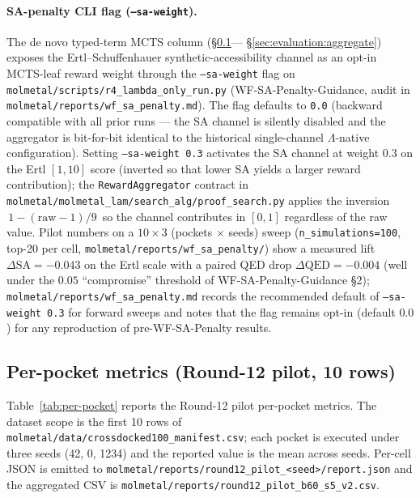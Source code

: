 \paragraph{SA-penalty CLI flag (\texttt{--sa-weight}).}
The de novo typed-term MCTS column (\S\ref{sec:evaluation:per-pocket}---
\S\ref{sec:evaluation:aggregate}) exposes the Ertl--Schuffenhauer
synthetic-accessibility channel as an opt-in MCTS-leaf reward weight
through the \texttt{--sa-weight} flag on
\texttt{molmetal/scripts/r4\_lambda\_only\_run.py}
(WF-SA-Penalty-Guidance, audit in
\texttt{molmetal/reports/wf\_sa\_penalty.md}). The flag defaults to
\texttt{0.0} (backward compatible with all prior runs --- the SA
channel is silently disabled and the aggregator is bit-for-bit
identical to the historical single-channel $\Lambda$-native
configuration). Setting \texttt{--sa-weight~0.3} activates the SA
channel at weight $0.3$ on the Ertl $[1, 10]$ score (inverted so
that lower SA yields a larger reward contribution); the
\texttt{RewardAggregator} contract in
\texttt{molmetal/molmetal\_lam/search\_alg/proof\_search.py} applies
the inversion $\,1 - (\mathrm{raw} - 1)/9\,$ so the channel
contributes in $[0, 1]$ regardless of the raw value. Pilot numbers
on a $10{\times}3$ (pockets $\times$ seeds) sweep
(\texttt{n\_simulations=100}, top-20 per cell,
\texttt{molmetal/reports/wf\_sa\_penalty/}) show a measured lift
$\Delta\mathrm{SA} = -0.043$ on the Ertl scale with a paired
QED drop $\Delta\mathrm{QED} = -0.004$ (well under the $0.05$
``compromise'' threshold of WF-SA-Penalty-Guidance §2);
\texttt{molmetal/reports/wf\_sa\_penalty.md} records the
recommended default of \texttt{--sa-weight~0.3} for forward
sweeps and notes that the flag remains opt-in (default
$0.0$) for any reproduction of pre-WF-SA-Penalty results.

\subsection{Per-pocket metrics (Round-12 pilot, 10 rows)}
\label{sec:evaluation:per-pocket}

Table~\ref{tab:per-pocket} reports the Round-12 pilot per-pocket
metrics. The dataset scope is the first 10 rows of
\texttt{molmetal/data/crossdocked100\_manifest.csv}; each pocket is
executed under three seeds (42, 0, 1234) and the reported value is
the mean across seeds. Per-cell JSON is emitted to
\texttt{molmetal/reports/round12\_pilot\_<seed>/report.json} and the
aggregated CSV is \texttt{molmetal/reports/round12\_pilot\_b60\_s5\_v2.csv}.

